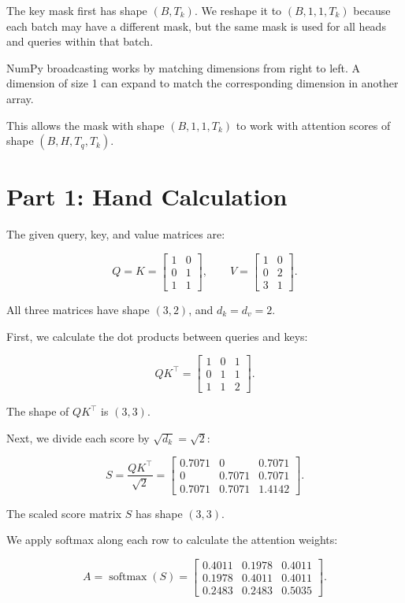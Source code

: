 \documentclass[11pt]{article}
\begin{document}
The key mask first has shape $(B, T_k)$. We reshape it
to $(B, 1, 1, T_k)$ because each batch may have a different
mask, but the same mask is used for all heads and queries
within that batch.

NumPy broadcasting works by matching dimensions from
right to left. A dimension of size 1 can expand to match
the corresponding dimension in another array.

This allows the mask with shape $(B, 1, 1, T_k)$ to work
with attention scores of shape $(B, H, T_q, T_k)$.
\section*{Part 1: Hand Calculation}
The given query, key, and value matrices are:

\[
Q=K=
\begin{bmatrix}
1 & 0\\
0 & 1\\
1 & 1
\end{bmatrix},
\qquad
V=
\begin{bmatrix}
1 & 0\\
0 & 2\\
3 & 1
\end{bmatrix}.
\]

All three matrices have shape $(3,2)$, and $d_k=d_v=2$.

First, we calculate the dot products between queries
and keys:

\[
QK^\top=
\begin{bmatrix}
1 & 0 & 1\\
0 & 1 & 1\\
1 & 1 & 2
\end{bmatrix}.
\]

The shape of $QK^\top$ is $(3,3)$.

Next, we divide each score by $\sqrt{d_k}=\sqrt{2}$:

\[
S=\frac{QK^\top}{\sqrt{2}}
=
\begin{bmatrix}
0.7071 & 0 & 0.7071\\
0 & 0.7071 & 0.7071\\
0.7071 & 0.7071 & 1.4142
\end{bmatrix}.
\]

The scaled score matrix $S$ has shape $(3,3)$.

We apply softmax along each row to calculate the
attention weights:

\[
A=\operatorname{softmax}(S)
=
\begin{bmatrix}
0.4011 & 0.1978 & 0.4011\\
0.1978 & 0.4011 & 0.4011\\
0.2483 & 0.2483 & 0.5035
\end{bmatrix}.
\]
\end{document}

